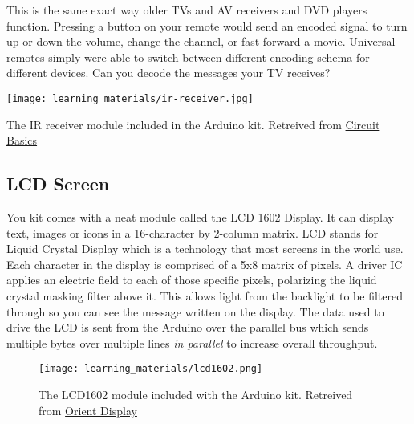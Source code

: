     This is the same exact way older TVs and AV receivers and DVD players function. 
    Pressing a button on your remote would send an encoded signal to turn up or down the volume, change the channel, or fast forward a movie.
    Universal remotes simply were able to switch between different encoding schema for different devices.
    Can you decode the messages your TV receives?

    \begin{marginfigure}[-2.5in]
        \texttt{[image: learning\_materials/ir-receiver.jpg]}
        \caption[IR Receiver]{The IR receiver module included in the Arduino kit. 
        Retreived from \href{https://www.circuitbasics.com/arduino-ir-remote-receiver-tutorial/}
        {Circuit Basics}}
    \end{marginfigure}

    \subsection*{LCD Screen}
    You kit comes with a neat module called the LCD 1602 Display.
    It can display text, images or icons in a 16-character by 2-column matrix.
    LCD stands for Liquid Crystal Display which is a technology that most screens in the world use. 
    Each character in the display is comprised of a 5x8 matrix of pixels.
    A driver IC applies an electric field to each of those specific pixels, polarizing the liquid crystal masking filter above it.
    This allows light from the backlight to be filtered through so you can see the message written on the display.
    The data used to drive the LCD is sent from the Arduino over the parallel bus which sends multiple bytes over multiple lines \textit{in parallel} to increase overall throughput.

    \begin{figure}[h!]
        \texttt{[image: learning\_materials/lcd1602.png]}
        \caption[LCD Module]{The LCD1602 module included with the Arduino kit. 
        Retreived from \href{https://www.orientdisplay.com/wp-content/uploads/2020/08/AMC1602AR-B-B6WTDW-I2C-1.jpg}
        {Orient Display}}
    \end{figure}


